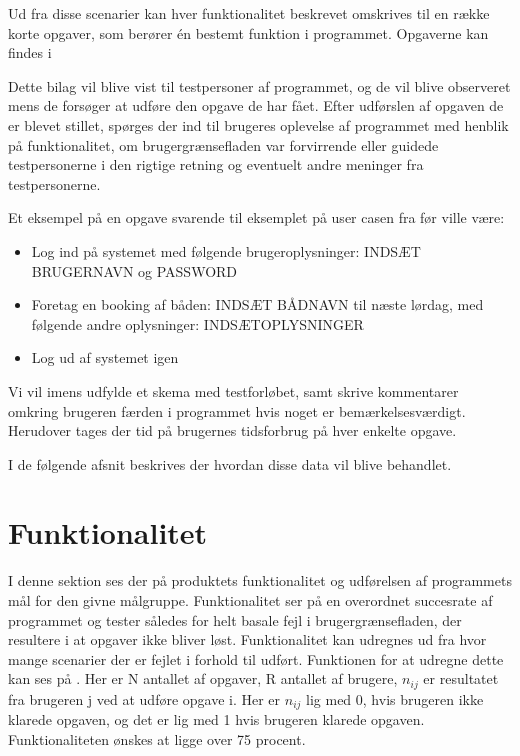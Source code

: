 Ud fra disse scenarier kan hver funktionalitet beskrevet omskrives til en række korte opgaver, som berører én bestemt funktion i programmet. Opgaverne kan findes i 

Dette bilag vil blive vist til testpersoner af programmet, og de vil blive observeret mens de forsøger at udføre den opgave de har fået. Efter udførslen af opgaven de er blevet stillet, spørges der ind til brugeres oplevelse af programmet med henblik på funktionalitet, om brugergrænsefladen var forvirrende eller guidede testpersonerne i den rigtige retning og eventuelt andre meninger fra testpersonerne.

Et eksempel på en opgave svarende til eksemplet på user casen fra før ville være:

\begin{itemize}
\item Log ind på systemet med følgende brugeroplysninger: INDSÆT BRUGERNAVN og PASSWORD
\item Foretag en booking af båden: INDSÆT BÅDNAVN til næste lørdag, med følgende andre oplysninger: INDSÆTOPLYSNINGER
\item Log ud af systemet igen
\end{itemize}

Vi vil imens udfylde et skema med testforløbet, samt skrive kommentarer omkring brugeren færden i programmet hvis noget er bemærkelsesværdigt. Herudover tages der tid på brugernes tidsforbrug på hver enkelte opgave.

I de følgende afsnit beskrives der hvordan disse data vil blive behandlet.


\section{Funktionalitet}
I denne sektion ses der på produktets funktionalitet og udførelsen af programmets mål for den givne målgruppe. Funktionalitet ser på en overordnet succesrate af programmet og tester således for helt basale fejl i brugergrænsefladen, der resultere i at opgaver ikke bliver løst. Funktionalitet kan udregnes ud fra hvor mange scenarier der er fejlet i forhold til udført. Funktionen for at udregne dette kan ses på . Her er N antallet af opgaver, R antallet af brugere, $n_{ij}$ er resultatet fra brugeren j ved at udføre opgave i. Her er $n_{ij}$ lig med 0, hvis brugeren ikke klarede opgaven, og det er lig med 1 hvis brugeren klarede opgaven. Funktionaliteten ønskes at ligge over 75 procent.\citep{UIEffectiveness}


